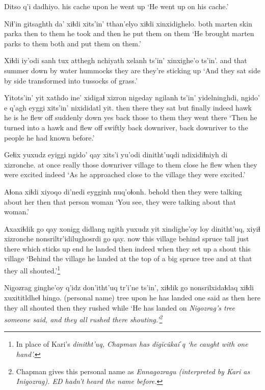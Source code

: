 \documentclass[12pt]{article}
\begin{document}
\gll Ditso  q'i dadhiyo.
{his cache} upon {he went up}
\glt `He went up on his cache.'
\glend

\gll Niɬ'in  gitsaghth da' xiɬdi xits'in' tthan'elyo xiɬdi  xinxidighelo.
both  {marten skin} parka  then {to them} {he took}  {and then} {he put them on them}
\glt `He brought marten parks to them both and put them on them.'
\glend

\gll Xiɬdi iy'odi  {sanh tux} atthegh nchiyath xelanh ts'in' xinxighe'o ts'in'.
and that summer {down by water} hummocks {they are} {} {they're sticking up} 
\glt `And they sat side by side transformed into tussocks of grass.'
\glend

\gll Yitots'in' yit xathdo ine' xidigaɬ xizron nigeday ngilanh ts'in' {yidelninghdi,} ngido' e q'agh eyggi xits'in' nixididatl yit.
then  there {they sat} but finally  indeed  hawk  {he is} {}   {he flew off suddenly} down  yes back those  {to them} {they went} there 
\glt `Then he turned into a hawk and flew off swiftly back downriver, back downriver to the people he had known before.'
\glend

\gll Geɬix yuxudz eyiggi  ngido' qay  xits'i  yu'odi dinitht'uqdi ndixidiɬniyh di xizronche.
{at once}  really  those  downriver village  {to them} close {he flew} when {they were excited} indeed
\glt  `As he approached close to the village they were excited.'
\glend
	
\gll Aɬona  xiɬdi {xiyoqo di'nedi} eygginh nuq'oɬonh.
behold then {they were talking about her} then {that person}  woman
\glt `You see, they were talking about that woman.'
\glend

\gll Axaxiɬdik go qay xonigg didlang ngith yuxudz yit xindighe'oy loy dinitht'uq,  xiyiɬ xizronche nonsriltr'idilughosrdi go qay.
now  this village behind  spruce  tall just  there {which sticks up}  end {he landed} then indeed  {when they set up a shout} this village
\glt `Behind the village he landed at the top of a big spruce tree and at that they all shouted.'\footnote{In place of Kari's \em dinitht'uq, \em Chapman has \em d\u{i}g\u{i}c\^ukaiˊq \em `he caught with one hand'.}
\glend

\gll Nigozrag ginghe'oy q'idz don'itht'uq tr'i'ne ts'in', xiɬdik go nonsrilxidaɬdaq xiɬdi xuxititldheɬ hingo.
{(personal name)} tree  upon {he has landed} {one said} as  then here {they all shouted} then {they rushed} while
\glt `He has landed on \em Nigozrag's \em tree someone said, and they all rushed there shouting.'\footnote{Chapman gives this personal name as \em Ennagozragu \em (interpreted by Kari as \em Inigozrag). \em ED hadn't heard the name before.}
\glend
\end{document}
